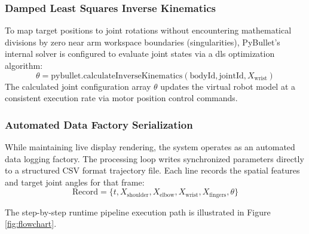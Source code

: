 \subsubsection{Damped Least Squares Inverse Kinematics}
To map target positions to joint rotations without encountering mathematical divisions by zero near arm workspace boundaries (singularities), PyBullet's internal solver is configured to evaluate joint states via a \gls{dls} optimization algorithm:
\begin{equation}
\theta = \text{pybullet.calculateInverseKinematics}(\text{bodyId}, \text{jointId}, X_{\text{wrist}})
\label{eq:4-5}
\end{equation}
The calculated joint configuration array $\theta$ updates the virtual robot model at a consistent execution rate via motor position control commands.

\subsubsection{Automated Data Factory Serialization}
While maintaining live display rendering, the system operates as an automated data logging factory. The processing loop writes synchronized parameters directly to a structured CSV format trajectory file. Each line records the spatial features and target joint angles for that frame:
\begin{equation}
\text{Record} = \{t, X_{\text{shoulder}}, X_{\text{elbow}}, X_{\text{wrist}}, X_{\text{fingers}}, \theta\}
\label{eq:4-6}
\end{equation}


The step-by-step runtime pipeline execution path is illustrated in Figure \ref{fig:flowchart}.



